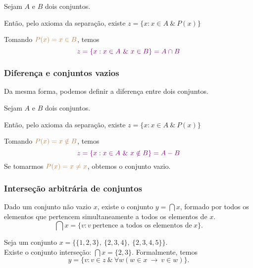          Sejam $A$ e $B$ dois conjuntos.

         Então, pelo axioma da separação, existe $z = \{x: x \in A\ \&\ P(x)\}$

         Tomando $\color{brown}{P(x) = x \in B}$, temos
         $$\color{violet}{z = \{x: x \in A\ \&\ x \in B \} = A \cap B}$$

         \subsubsection*{Diferença e conjuntos vazios}
         Da mesma forma, podemos definir a diferença entre dois conjuntos.

         Sejam $A$ e $B$ dois conjuntos.

         Então, pelo axioma da separação, existe $z = \{x: x \in A\ \&\ P(x)\}$

         Tomando $\color{brown}{P(x) = x \notin B}$, temos
         $$\color{violet}{z = \{x: x \in A\ \&\ x \notin B \} = A - B}$$
         Se tomarmos $\color{brown}{P(x) = x \neq x}$, obtemos o conjunto vazio.

      \subsubsection*{Interseção arbitrária de conjuntos}
         \begin{theorem}
            Dado um conjunto não vazio $x$, existe o conjunto $y = \bigcap x$, formado por todos os elementos que pertencem simultaneamente a todos os elementos de $x$.
         $$\bigcap x = \{v: v\ \textrm{pertence a todos os elementos de}\ x\}.$$
         \end{theorem}
         \begin{exmp}
            Seja um conjunto $x = \{\{1,2,3\},\ \{2,3,4\},\ \{2,3,4,5\}\}.$\\
            Existe o conjunto interseção: $\bigcap x = \{2,3\}.$
            Formalmente, temos $$y = \{v: v \in z\ \&\ \forall w (w \in x\ \rightarrow\ v \in w)\}.$$
         \end{exmp}


